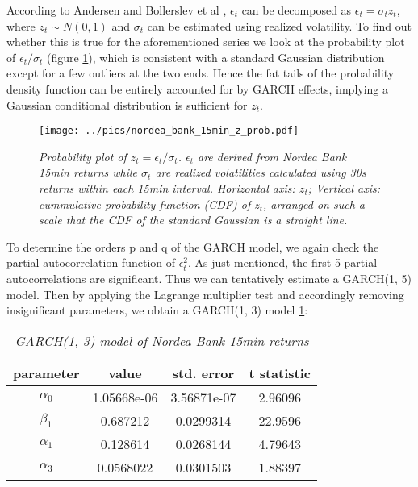 According to Andersen and Bollerslev et al \cite{Andersen03},
$\epsilon_t$ can be decomposed as $\epsilon_t = \sigma_t z_t$, where
$z_t \sim N(0, 1)$ and $\sigma_t$ can be estimated using realized
volatility. To find out whether this is true for the aforementioned
series we look at the probability plot of $\epsilon_t/\sigma_t$
(figure \ref{fig:nordea_bank_15min_z_prob}), which is consistent with
a standard Gaussian distribution except for a few outliers at the two
ends. Hence the fat tails of the probability density function can be
entirely accounted for by GARCH effects, implying a Gaussian
conditional distribution is sufficient for $z_t$.
\begin{figure}[htb!]
  \centering
    \texttt{[image: ../pics/nordea\_bank\_15min\_z\_prob.pdf]}
  \caption{\small \it{Probability plot of $z_t = \epsilon_t /
      \sigma_t$. $\epsilon_t$ are derived from Nordea Bank 15min
      returns while $\sigma_t$ are realized volatilities calculated
      using 30s returns within each 15min interval. Horizontal axis:
      $z_t$}; Vertical axis: cummulative probability function (CDF) of
    $z_t$, arranged on such a scale that the CDF of the standard
    Gaussian is a straight line.}
  \label{fig:nordea_bank_15min_z_prob}
\end{figure}

To determine the orders p and q of the GARCH model, we again check
the partial autocorrelation function of $\epsilon_t^2$. As just
mentioned, the first 5 partial autocorrelations are significant. Thus
we can tentatively estimate a GARCH(1, 5) model. Then by applying the
Lagrange multiplier test and accordingly removing insignificant
parameters, we obtain a GARCH(1, 3) model
\ref{tab:nordea_15min_garch}:
\begin{table}[htb!]
  \centering
  \begin{tabular}{|c|c|c|c|}
    \hline
    parameter & value & std. error & t statistic \\
    \hline
     $\alpha_0$ &   1.05668e-06 &   3.56871e-07 &    2.96096\\
     \hline
     $\beta_1$  &     0.687212  &   0.0299314   &    22.9596\\
     \hline
     $\alpha_1$ &      0.128614 &   0.0268144   &    4.79643\\
     \hline
     $\alpha_3$ &    0.0568022  &   0.0301503   &    1.88397 \\
     \hline
  \end{tabular}
  \caption{\small \it GARCH(1, 3) model of Nordea Bank 15min returns}
  \label{tab:nordea_15min_garch}
\end{table}

